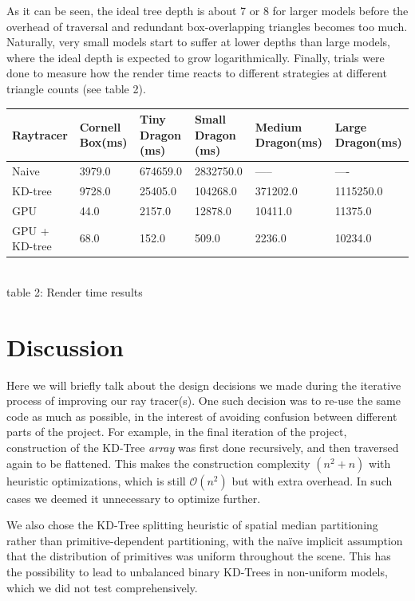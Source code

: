 \documentclass[letterpaper, 10 pt, conference]{ieeeconf}  %
\begin{document}
As it can be seen, the ideal tree depth is about 7 or 8 for larger models before the overhead of traversal and redundant box-overlapping triangles becomes too much. Naturally, very small models start to suffer at lower depths than large models, where the ideal depth is expected to grow logarithmically. Finally, trials were done to measure how the render time reacts to different strategies at different triangle counts (see table 2).

\begin{table}[t]
\centering
\begin{tabular}{@{}llllll@{}}
\toprule
Raytracer     & Cornell Box(ms) & Tiny Dragon (ms) & Small Dragon (ms) & Medium Dragon(ms) & Large Dragon(ms) \\ \midrule
Naive         & 3979.0          & 674659.0         & 2832750.0         & -----         &                  ----\\
KD-tree       & 9728.0          & 25405.0          & 104268.0          & 371202.0          & 1115250.0        \\
GPU           & 44.0            & 2157.0           & 12878.0           & 10411.0           & 11375.0          \\
GPU + KD-tree & 68.0            & 152.0            & 509.0             & 2236.0            & 10234.0          \\ \bottomrule
\end{tabular}\\

table 2: Render time results
\end{table}

\section{Discussion}
Here we will briefly talk about the design decisions we made during the iterative process of improving our ray tracer(s). One such decision was to re-use the same code as much as possible, in the interest of avoiding confusion between different parts of the project. For example, in the final iteration of the project, construction of the KD-Tree \textit{array} was first done recursively, and then traversed again to be flattened. This makes the construction complexity $(n^2+n)$ with heuristic optimizations, which is still $\mathcal{O}(n^2)$ but with extra overhead. In such cases we deemed it unnecessary to optimize further.

We also chose the KD-Tree splitting heuristic of spatial median partitioning rather than primitive-dependent partitioning, with the naïve implicit assumption that the distribution of primitives was uniform throughout the scene. This has the possibility to lead to unbalanced binary KD-Trees in non-uniform models, which we did not test comprehensively.
\end{document}
